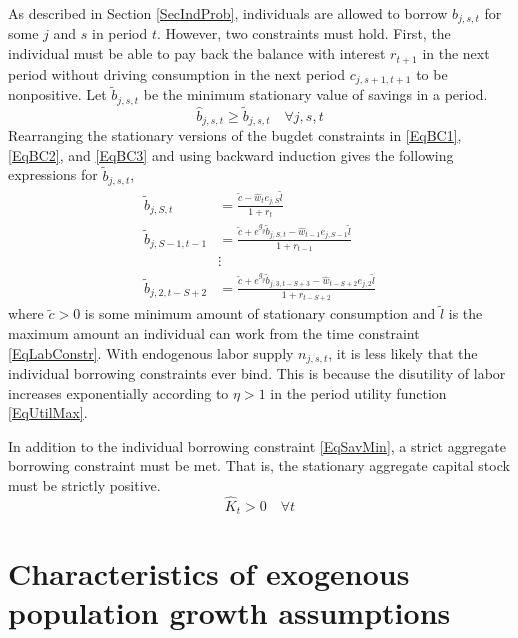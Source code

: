 \documentclass[letterpaper,12pt]{article}
\theoremstyle{definition}
\begin{document}
  As described in Section \ref{SecIndProb}, individuals are allowed to borrow $b_{j,s,t}$ for some $j$ and $s$ in period $t$. However, two constraints must hold. First, the individual must be able to pay back the balance with interest $r_{t+1}$ in the next period without driving consumption in the next period $c_{j,s+1,t+1}$ to be nonpositive. Let $\tilde{b}_{j,s,t}$ be the minimum stationary value of savings in a period.
  \begin{equation}\label{EqSavMin}
    \hat{b}_{j,s,t}\geq\tilde{b}_{j,s,t} \quad\forall j,s,t
  \end{equation}
  Rearranging the stationary versions of the bugdet constraints in \eqref{EqBC1}, \eqref{EqBC2}, and \eqref{EqBC3} and using backward induction gives the following expressions for $\tilde{b}_{j,s,t}$,
  \begin{equation}\label{EqBorConsts}
    \begin{split}
      \tilde{b}_{j,S,t} &= \frac{\tilde{c} - \hat{w}_t e_{j,S}\tilde{l}}{1+r_t}  \\
      \tilde{b}_{j,S-1,t-1} &= \frac{\tilde{c} + e^{g_y}\tilde{b}_{j,S,t} - \hat{w}_{t-1}e_{j,S-1}\tilde{l}}{1+r_{t-1}} \\
      &\vdots \\
      \tilde{b}_{j,2,t-S+2} &= \frac{\tilde{c} + e^{g_y}\tilde{b}_{j,3,t-S+3} - \hat{w}_{t-S+2}e_{j,2}\tilde{l}}{1+r_{t-S+2}}
    \end{split}
  \end{equation}
  where $\tilde{c}>0$ is some minimum amount of stationary consumption and $\tilde{l}$ is the maximum amount an individual can work from the time constraint \eqref{EqLabConstr}. With endogenous labor supply $n_{j,s,t}$, it is less likely that the individual borrowing constraints ever bind. This is because the disutility of labor increases exponentially according to $\eta>1$ in the period utility function \eqref{EqUtilMax}.

  In addition to the individual borrowing constraint \eqref{EqSavMin}, a strict aggregate borrowing constraint must be met. That is, the stationary aggregate capital stock must be strictly positive.
  \begin{equation}\label{EqAggrCapConstr}
    \hat{K}_t > 0 \quad\forall t
  \end{equation}


\newpage
\section{Characteristics of exogenous population growth assumptions}\label{AppPopGrowth}
\end{document}
